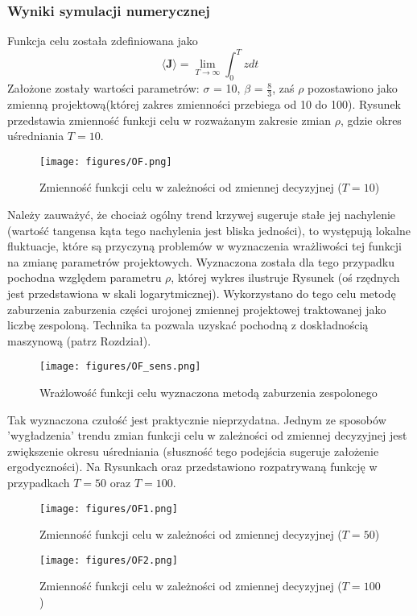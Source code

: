 \documentclass[12pt]{article}
\begin{document}
\subsubsection{Wyniki symulacji numerycznej}
Funkcja celu została zdefiniowana jako
\begin{equation}
\langle\textbf{J}\rangle = \lim\limits_{\textit{T}\to\infty}\int_{0}^{T}zdt
\label{lorenz_J}
\end{equation} 
Założone zostały wartości parametrów: $\sigma$ = 10, $\beta$ = $\frac{8}{3}$, zaś $\rho$ pozostawiono jako zmienną projektową(której zakres zmienności przebiega od 10 do 100). Rysunek przedstawia zmienność funkcji celu w rozważanym zakresie zmian $ \rho $, gdzie okres uśredniania $ T = 10 $.
\begin{figure}[H]
	\texttt{[image: figures/OF.png]} 
	\centering
	\caption{Zmienność funkcji celu w zależności od zmiennej decyzyjnej ($ T=10 $)}
\end{figure}
Należy zauważyć, że chociaż ogólny trend krzywej sugeruje stałe jej nachylenie (wartość tangensa kąta tego nachylenia jest bliska jedności), to występują lokalne fluktuacje, które są przyczyną problemów w wyznaczenia wrażliwości tej funkcji na zmianę parametrów projektowych. Wyznaczona została dla tego przypadku pochodna względem parametru $ \rho $, której wykres ilustruje Rysunek (oś rzędnych jest przedstawiona w skali logarytmicznej). Wykorzystano do tego celu metodę zaburzenia zaburzenia części urojonej zmiennej projektowej traktowanej jako liczbę zespoloną. Technika ta pozwala uzyskać pochodną z doskładnością maszynową (patrz Rozdział).
\begin{figure}[H]
	\texttt{[image: figures/OF\_sens.png]} 
	\centering
	\caption{Wrażlowość funkcji celu wyznaczona metodą zaburzenia zespolonego}
\end{figure}
Tak wyznaczona czułość jest praktycznie nieprzydatna. Jednym ze sposobów 'wygładzenia' trendu zmian funkcji celu w zależności od zmiennej decyzyjnej jest zwiększenie okresu uśredniania (słuszność tego podejścia sugeruje założenie ergodyczności). Na Rysunkach oraz  przedstawiono rozpatrywaną funkcję w przypadkach $ T = 50 $ oraz $ T = 100 $.
\begin{figure}[H]
	\texttt{[image: figures/OF1.png]} 
	\centering
	\caption{Zmienność funkcji celu w zależności od zmiennej decyzyjnej ($ T=50 $)}
\end{figure}
\begin{figure}[H]
	\texttt{[image: figures/OF2.png]} 
	\centering
	\caption{Zmienność funkcji celu w zależności od zmiennej decyzyjnej ($ T=100 $)}
\end{figure}
\end{document}
